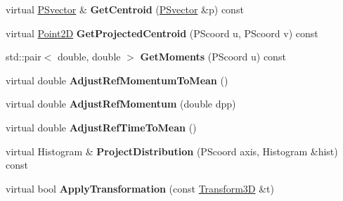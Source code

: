 \begin{DoxyCompactItemize}
\item 
\mbox{\label{classParticleTracking_1_1ParticleBunch_ae73578f6511c0818911bfb4f648019d9}} 
virtual \hyperlink{classPSvector}{P\+Svector} \& {\bfseries Get\+Centroid} (\hyperlink{classPSvector}{P\+Svector} \&p) const
\item 
\mbox{\label{classParticleTracking_1_1ParticleBunch_a71204780add21070d0a786c3ad63b2b2}} 
virtual \hyperlink{classTVec2D}{Point2D} {\bfseries Get\+Projected\+Centroid} (P\+Scoord u, P\+Scoord v) const
\item 
\mbox{\label{classParticleTracking_1_1ParticleBunch_a00448df068be92b4f2e422cd3c40cc75}} 
std\+::pair$<$ double, double $>$ {\bfseries Get\+Moments} (P\+Scoord u) const
\item 
\mbox{\label{classParticleTracking_1_1ParticleBunch_ae7043cde02ad717d725c3124b9bd9a28}} 
virtual double {\bfseries Adjust\+Ref\+Momentum\+To\+Mean} ()
\item 
\mbox{\label{classParticleTracking_1_1ParticleBunch_a3730d6184e22e70aa9800babdfb0e4f0}} 
virtual double {\bfseries Adjust\+Ref\+Momentum} (double dpp)
\item 
\mbox{\label{classParticleTracking_1_1ParticleBunch_a166ad1ed26790989382b46dce32e5cd2}} 
virtual double {\bfseries Adjust\+Ref\+Time\+To\+Mean} ()
\item 
\mbox{\label{classParticleTracking_1_1ParticleBunch_a493b7923034c9e1324593abdc52e5701}} 
virtual Histogram \& {\bfseries Project\+Distribution} (P\+Scoord axis, Histogram \&hist) const
\item 
\mbox{\label{classParticleTracking_1_1ParticleBunch_a04af80ddfa77fa113827ff2cb56413b4}} 
virtual bool {\bfseries Apply\+Transformation} (const \hyperlink{classTransform3D}{Transform3D} \&t)
\item 
\mbox{\label{classParticleTracking_1_1ParticleBunch_a746e576dc7298bd9fb94a053c4cd8b28}} 

\end{DoxyCompactItemize}
